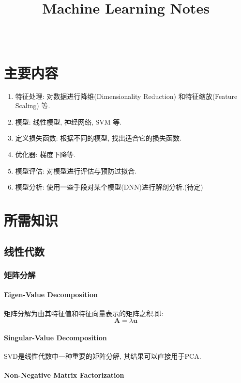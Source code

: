 \documentclass[oneside]{book}
\title{\titlteFont Machine Learning Notes}
\author{\authorFont{Jiang Tao}\\ \NovaMonoFont{vix2018@gmail.com}}
\date{\NovaMonoFont 2019}
\begin{document}
	\begin{titlepage}
		\maketitle
	\end{titlepage}
	\tableofcontents
	\setcounter{chapter}{0}
	\renewcommand{\thechapter}{\Roman{chapter}}
	\chapter{主要内容}
			\begin{enumerate} 
				\item 特征处理: 对数据进行降维(Dimensionality Reduction) 和特征缩放(Feature Scaling) 等.
				\item 模型: 线性模型, 神经网络, SVM 等.
				\item 定义损失函数: 根据不同的模型, 找出适合它的损失函数.
				\item 优化器: 梯度下降等.
				\item 模型评估: 对模型进行评估与预防过拟合.
				\item 模型分析: 使用一些手段对某个模型(DNN)进行解剖分析.(待定)
			\end{enumerate}
	\chapter{所需知识}
		\section{线性代数}
			\subsection{矩阵分解}
				\subsubsection{Eigen-Value Decomposition}
					矩阵分解为由其特征值和特征向量表示的矩阵之积.即:
					$$\boldsymbol{A} = \lambda \boldsymbol{u}$$
				\subsubsection{Singular-Value Decomposition}
					SVD是线性代数中一种重要的矩阵分解, 其结果可以直接用于PCA.	
				\subsubsection{Non-Negative Matrix Factorization}	
\end{document}
